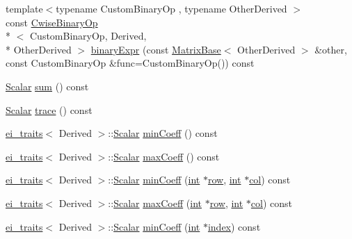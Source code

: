 \begin{DoxyCompactItemize}
{\footnotesize template$<$typename Custom\-Binary\-Op , typename Other\-Derived $>$ }\\const \hyperlink{class_cwise_binary_op}{Cwise\-Binary\-Op}\\*
$<$ Custom\-Binary\-Op, Derived, \\*
Other\-Derived $>$ \hyperlink{class_matrix_base_a570e5bedaff2be3edb17cccd512e5bba}{binary\-Expr} (const \hyperlink{class_matrix_base}{Matrix\-Base}$<$ Other\-Derived $>$ \&other, const Custom\-Binary\-Op \&func=Custom\-Binary\-Op()) const 
\item 
\hyperlink{class_matrix_base_a625df8339dc2d816cbc0fd66e7dadaf5}{Scalar} \hyperlink{class_matrix_base_a90273cb5e6d7717c56d27bdc95e21c77}{sum} () const 
\item 
\hyperlink{class_matrix_base_a625df8339dc2d816cbc0fd66e7dadaf5}{Scalar} \hyperlink{class_matrix_base_a8d6d6df726148dfabcefae5d5ccd219a}{trace} () const 
\item 
\hyperlink{structei__traits}{ei\-\_\-traits}$<$ Derived $>$\-::\hyperlink{class_matrix_base_a625df8339dc2d816cbc0fd66e7dadaf5}{Scalar} \hyperlink{class_matrix_base_aa36d25ae8e91fdbe8967158a32cf6a6c}{min\-Coeff} () const 
\item 
\hyperlink{structei__traits}{ei\-\_\-traits}$<$ Derived $>$\-::\hyperlink{class_matrix_base_a625df8339dc2d816cbc0fd66e7dadaf5}{Scalar} \hyperlink{class_matrix_base_aee6ed699ae82998d7c8221abe502850a}{max\-Coeff} () const 
\item 
\hyperlink{structei__traits}{ei\-\_\-traits}$<$ Derived $>$\-::\hyperlink{class_matrix_base_a625df8339dc2d816cbc0fd66e7dadaf5}{Scalar} \hyperlink{class_matrix_base_aecfd4f36503ad32ccf82313b9e5435f5}{min\-Coeff} (\hyperlink{ioapi_8h_a787fa3cf048117ba7123753c1e74fcd6}{int} $\ast$\hyperlink{glext_8h_a11b277b422822f784ee248b43eee3e1e}{row}, \hyperlink{ioapi_8h_a787fa3cf048117ba7123753c1e74fcd6}{int} $\ast$\hyperlink{class_matrix_base_ae3c94b0f25b4273c7a8125169bdf60e0}{col}) const 
\item 
\hyperlink{structei__traits}{ei\-\_\-traits}$<$ Derived $>$\-::\hyperlink{class_matrix_base_a625df8339dc2d816cbc0fd66e7dadaf5}{Scalar} \hyperlink{class_matrix_base_ab45986fd3a390996eb2b3800dadf114a}{max\-Coeff} (\hyperlink{ioapi_8h_a787fa3cf048117ba7123753c1e74fcd6}{int} $\ast$\hyperlink{glext_8h_a11b277b422822f784ee248b43eee3e1e}{row}, \hyperlink{ioapi_8h_a787fa3cf048117ba7123753c1e74fcd6}{int} $\ast$\hyperlink{class_matrix_base_ae3c94b0f25b4273c7a8125169bdf60e0}{col}) const 
\item 
\hyperlink{structei__traits}{ei\-\_\-traits}$<$ Derived $>$\-::\hyperlink{class_matrix_base_a625df8339dc2d816cbc0fd66e7dadaf5}{Scalar} \hyperlink{class_matrix_base_ab0d32dfb9cb080b2eb9a786d5f5837e6}{min\-Coeff} (\hyperlink{ioapi_8h_a787fa3cf048117ba7123753c1e74fcd6}{int} $\ast$\hyperlink{glext_8h_ab47dd9958bcadea08866b42bf358e95e}{index}) const 

\end{DoxyCompactItemize}
